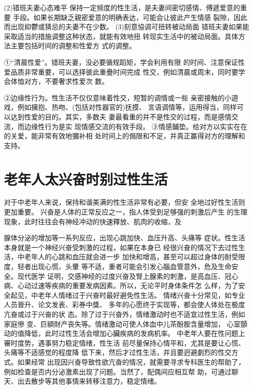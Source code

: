 \documentclass[12pt,UTF8]{ctexbook}
\begin{document}
(2)错班夫妻心态难平
保持一定频度的性生活，是夫妻间密切感情、傅遞爱意的重要
手段。如果长期缺乏親密爱意的明确表达，可能会让彼此产生情感
裂隙，因此而出现抑鬱或猜忌的夫妻不在少数。
(3)刻意協调可扭转被动局面
错班夫妻如果能采取适当的措施调整这种状态，就能有效地扭
转现实生活中的被动局面。具体方法主要包括时间的调整和性爱方
式的调整。

①“清晨性爱”。错班夫妻，没必要循规蹈矩，学会利用有限
的时间、注意保证性爱品质非常重要，可以选择彼此重疊时间完成
性交，例如清晨或周末，同时要学会体恤对方，不要奢求性爱次
数。

②边缘性行为。性生活不仅仅意味着性交，短暂的调情或一些
亲密接触的小遊戏，例如擁抱、热吻、(包括对性器官的)抚摸、
言语调情等，运用得当，同样可以达到性爱的目的。其实，多数夫
妻最看重的并不是性交的过程，而是感情交流，而边缘性行为是实
现情感交流的有效手段。
③情感鋪垫。给对方以实实在在的关爱，能非常有效地彌补相
处时间上的侷限和不足，并真正赢得对方的理解和支持。


\section{老年人太兴奋时别过性生活}

对于中老年人来说，保持和谐美满的性生活非常有必要，但安
全地过好性生活则更加重要。
兴奋是人体的正常反应之一，指人体受到足够强的刺激后产生
的生理现象，此时往往会有神经冲动的快速釋放、肌肉的收缩，及

腺体分泌的增加等一系列反应，出现心跳加快、血压升高、头痛等
症状。性生活本身就是一个神经兴奋受刺激的过程，如果在本身已
经很兴奋的情况下去过性生活，中老年人的心跳和血压就会进一步
加快和增高，甚至可以超过身体的耐受限度，轻者出现心慌、头暈
等不适，重者可能会引发心腦血管意外，危及生命安全。现代医学
证明，交感神经的过度兴奋及腎上腺素的刺激，是高血压、冠心
病、心动过速等疾病的重要发病因素。所以，无论平时身体条件怎
么样，为了安全起见，中老年人情绪过于兴奋时最好避免性生活。
情绪兴奋十分常见，如专业人员晉升、论文发表、彩券中獎、
多年的心愿终于实现等，都会使人体处在极度亢奋或过于兴奋的状
态。除了过于兴奋外，情绪激动时也不适宜过性生活，例如家庭慘
变、巨額財产丧失等。情绪激动可使人体血中儿茶酚胺含量增加，
心室顫动的值降低，此时过性生活会增加心臟疾病的发病机率。
中老年人要在性问题上審时度势，遇事努力稳定情绪，性生活
前尽量保持心情平和，尤其是要让心慌、头痛等不适感觉的程度降
低下来，然后才过性生活，并且要迥避劇烈的性交方式。如果经常
出现因兴奋导致性欲亢奋的情况，就需要寻求专科医生的帮助了，
例如检查是否内分泌激素出现了问题。当然了，配偶间应相互帮
助，可通过聊天、出去散步等其他事情来转移注意力，稳定情绪。
\end{document}
